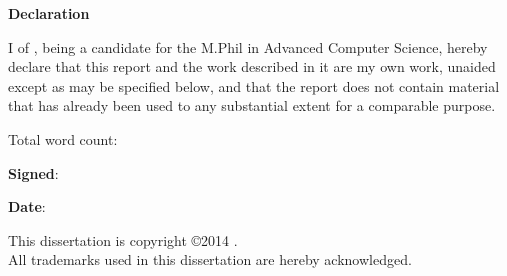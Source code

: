 \newpage
{\Huge \bf Declaration}

\vspace{24pt} 

I \authorname of \authorcollege, being a candidate for the M.Phil in
Advanced Computer Science, hereby declare that this report and the
work described in it are my own work, unaided except as may be
specified below, and that the report does not contain material that
has already been used to any substantial extent for a comparable
purpose.

\vspace{24pt}
Total word count: \wordcount

\vspace{60pt}
\textbf{Signed}: 

\vspace{12pt}
\textbf{Date}:


\vfill

This dissertation is copyright \copyright 2014 \authorname. 
\\
All trademarks used in this dissertation are hereby acknowledged.



\newpage
\vspace*{\fill}
